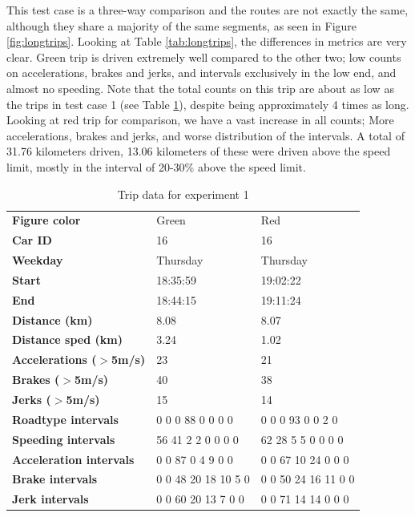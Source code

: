 This test case is a three-way comparison and the routes are not exactly the same, although they share a majority of the same segments, as seen in Figure \ref{fig:longtrips}. Looking at Table \ref{tab:longtrips}, the differences in metrics are very clear. Green trip is driven extremely well compared to the other two; low counts on accelerations, brakes and jerks, and intervals exclusively in the low end, and almost no speeding. Note that the total counts on this trip are about as low as the trips in test case 1 (see Table \ref{tab:shorttrips}), despite being approximately 4 times as long.
Looking at red trip for comparison, we have a vast increase in all counts; More accelerations, brakes and jerks, and worse distribution of the intervals. A total of 31.76 kilometers driven, 13.06 kilometers of these were driven above the speed limit, mostly in the interval of 20-30\% above the speed limit.

\begin{table}
    \centering
    \begin{tabular}{>{\bfseries}l|ll|}
    Figure color             & Green               & Red                 \\
    Car ID                   & 16                  & 16                  \\
    Weekday                  & Thursday            & Thursday            \\
    Start                    & 18:35:59            & 19:02:22            \\
    End                      & 18:44:15            & 19:11:24            \\
    Distance (km)            & 8.08                & 8.07                \\
    Distance sped (km)       & 3.24                & 1.02                \\
    Accelerations ($>$5m/s)  & 23                  & 21                  \\
    Brakes ($>$5m/s)         & 40                  & 38                  \\
    Jerks ($>$5m/s)          & 15                  & 14                  \\
    Roadtype intervals       & 0 0 0 88 0 0 0 0    & 0 0 0 93 0 0 2 0    \\
    Speeding intervals       & 56 41 2 2 0 0 0 0   & 62 28 5 5 0 0 0 0   \\
    Acceleration intervals   & 0 0 87 0 4 9 0 0    & 0 0 67 10 24 0 0 0  \\
    Brake intervals          & 0 0 48 20 18 10 5 0 & 0 0 50 24 16 11 0 0 \\
    Jerk intervals           & 0 0 60 20 13 7 0 0  & 0 0 71 14 14 0 0 0  \\
    \end{tabular}
    \caption{Trip data for experiment 1}
    \label{tab:shorttrips}
\end{table}

